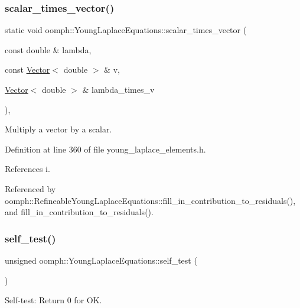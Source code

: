 \subsubsection{\texorpdfstring{scalar\+\_\+times\+\_\+vector()}{scalar\_times\_vector()}}
{\footnotesize\ttfamily static void oomph\+::\+Young\+Laplace\+Equations\+::scalar\+\_\+times\+\_\+vector (\begin{DoxyParamCaption}\item[{const double \&}]{lambda,  }\item[{const \hyperlink{classoomph_1_1Vector}{Vector}$<$ double $>$ \&}]{v,  }\item[{\hyperlink{classoomph_1_1Vector}{Vector}$<$ double $>$ \&}]{lambda\+\_\+times\+\_\+v }\end{DoxyParamCaption})\hspace{0.3cm}{\ttfamily [inline]}, {\ttfamily [static]}}



Multiply a vector by a scalar. 



Definition at line 360 of file young\+\_\+laplace\+\_\+elements.\+h.



References i.



Referenced by oomph\+::\+Refineable\+Young\+Laplace\+Equations\+::fill\+\_\+in\+\_\+contribution\+\_\+to\+\_\+residuals(), and fill\+\_\+in\+\_\+contribution\+\_\+to\+\_\+residuals().

\mbox{\label{classoomph_1_1YoungLaplaceEquations_a5856fb3002cc7e9c860331d2c8c87c10}} 
\subsubsection{\texorpdfstring{self\+\_\+test()}{self\_test()}}
{\footnotesize\ttfamily unsigned oomph\+::\+Young\+Laplace\+Equations\+::self\+\_\+test (\begin{DoxyParamCaption}{ }\end{DoxyParamCaption})\hspace{0.3cm}{\ttfamily [virtual]}}



Self-\/test\+: Return 0 for OK. 



